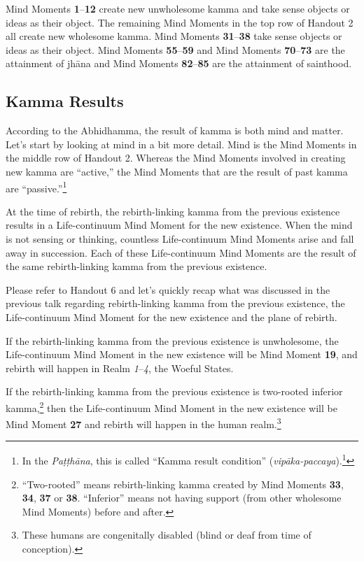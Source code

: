 Mind Moments \textbf{1}--\textbf{12} create new unwholesome kamma and take sense objects or ideas as their object. The remaining Mind Moments in the top row of Handout 2 all create new wholesome kamma. Mind Moments \textbf{31}--\textbf{38} take sense objects or ideas as their object. Mind Moments \textbf{55}--\textbf{59} and Mind Moments \textbf{70}--\textbf{73} are the attainment of jhāna and Mind Moments \textbf{82}--\textbf{85} are the attainment of sainthood.

\subsection*{Kamma Results}

According to the Abhidhamma, the result of kamma is both mind and matter. Let’s start by looking at mind in a bit more detail. Mind is the Mind Moments in the middle row of Handout 2. Whereas the Mind Moments involved in creating new kamma are “active,” the Mind Moments that are the result of past kamma are “passive.”\footnote{In the \textit{Paṭṭhāna}, this is called “Kamma result condition” (\textit{vipāka-paccaya}).\footnote{More details in Chapter 12 of “The Conditionality of Life” (see Footnote 2).}}

At the time of rebirth, the rebirth-linking kamma from the previous existence results in a Life-continuum Mind Moment for the new existence. When the mind is not sensing or thinking, countless Life-continuum Mind Moments arise and fall away in succession. Each of these Life-continuum Mind Moments are the result of the same rebirth-linking kamma from the previous existence.

Please refer to Handout 6 and let’s quickly recap what was discussed in the previous talk regarding rebirth-linking kamma from the previous existence, the Life-continuum Mind Moment for the new existence and the plane of rebirth.

If the rebirth-linking kamma from the previous existence is unwholesome, the Life-continuum Mind Moment in the new existence will be Mind Moment \textbf{19}, and rebirth will happen in Realm \textit{1}--\textit{4}, the Woeful States. 

If the rebirth-linking kamma from the previous existence is two-rooted inferior kamma,\footnote{“Two-rooted” means rebirth-linking kamma created by Mind Moments \textbf{33}, \textbf{34}, \textbf{37} or \textbf{38}. “Inferior” means not having support (from other wholesome Mind Moments) before and after.} then the Life-continuum Mind Moment in the new existence will be Mind Moment \textbf{27} and rebirth will happen in the human realm.\footnote{These humans are congenitally disabled (blind or deaf from time of conception).}

